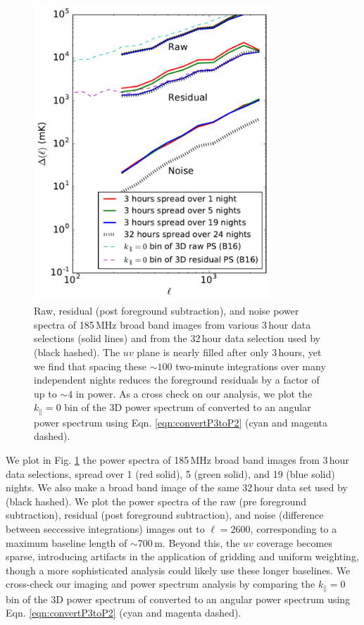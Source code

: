 \documentclass[numberedappendix]{emulateapj}
\begin{document}
\begin{figure}[h]
\centering
\includegraphics[width=3.5in]{chap5_xcor/res_pspec_of_100_obsids_with_diff_spacings_6amin_delta.pdf}
\caption{Raw, residual (post foreground subtraction), and noise power spectra of 185\,MHz broad band images from various 3\,hour data selections (solid lines) and from the 32\,hour data selection used by  \citet{beardsley16} (black hashed). The $uv$ plane is nearly filled after only 3\,hours, yet we find that spacing these $\sim100$ two-minute integrations over many independent nights reduces the foreground residuals by a factor of up to $\sim4$ in power. As a cross check on our analysis, we plot the $k_\parallel=0$ bin of the 3D power spectrum of \citet{beardsley16} converted to an angular power spectrum using Eqn. \ref{eqn:convertP3toP2} (cyan and magenta dashed).}
\label{fig:respspecspacingsstudy}
\end{figure}

We plot in Fig. \ref{fig:respspecspacingsstudy} the power spectra of 185\,MHz broad band images from  3\,hour data selections, spread over 1 (red solid), 5 (green solid), and 19 (blue solid) nights. We also make a broad band image of the same 32\,hour data set used by \citet{beardsley16} (black hashed). We plot the power spectra of the raw (pre foreground subtraction), residual (post foreground subtraction), and noise (difference between seccessive integrations) images out to $\ell=2600$, corresponding to a maximum baseline length of $\sim$700\,m. Beyond this, the $uv$ coverage becomes sparse, introducing artifacts in the application of gridding and uniform weighting, though a more sophisticated analysis could likely use these longer baselines. We cross-check our imaging and power spectrum analysis by comparing the  $k_\parallel=0$ bin of the 3D power spectrum of \citet{beardsley16} converted to an angular power spectrum using Eqn. \ref{eqn:convertP3toP2} (cyan and magenta dashed). 
\end{document}
